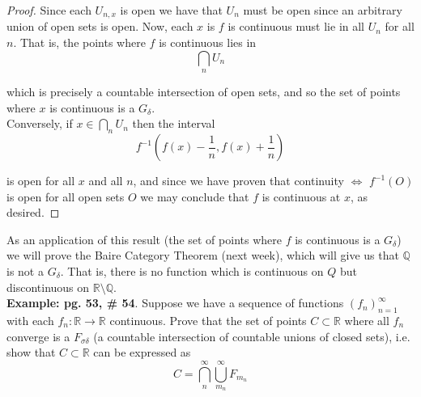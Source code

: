 \documentclass[12pt]{article}
\newlength\tindent
\renewcommand{\indent}{\hspace*{\tindent}}
\newcommand{\R}{\mathbb R}
\newcommand{\Q}{\mathbb Q}
\begin{document}
\begin{proof}
\indent Since each $U_{n,x}$ is open we have that $U_n$ must be open since an arbitrary union of open sets is open. Now, each $x$ is $f$ is continuous must lie in all $U_n$ for all $n$. That is, the points where $f$ is continuous lies in
\begin{equation*}
	\bigcap_{n} U_n
\end{equation*}

which is precisely a countable intersection of open sets, and so the set of points where $x$ is continuous is a $G_\delta$. \\

Conversely, if $x \in \bigcap_n U_n$ then the interval
\begin{equation*}
	f^{-1} \left( f(x) - \frac{1}{n}, f(x) + \frac{1}{n} \right)
\end{equation*}

is open for all $x$ and all $n$, and since we have proven that continuity $\iff$ $f^{-1}(O)$ is open for all open sets $O$ we may conclude that $f$ is continuous at $x$, as desired.
\end{proof}

\indent As an application of this result (the set of points where $f$ is continuous is a $G_\delta$) we will prove the Baire Category Theorem (next week), which will give us that $\Q$ is not a $G_\delta$. That is, there is no function which is continuous on $Q$ but discontinuous on $\R\setminus\Q$. \\

{\bf Example: pg. 53, \# 54}. Suppose we have a sequence of functions $(f_n)^\infty_{n = 1}$ with each $f_n:\R\to\R$ continuous. Prove that the set of points $C \subset \R$ where all $f_n$ converge is a $F_{\sigma\delta}$ (a countable intersection of countable unions of closed sets), i.e. show that $C \subset \R$ can be expressed as
\begin{equation*}
	C = \bigcap^\infty_{n} \bigcup^\infty_{m_n} F_{m_n}
\end{equation*}
\end{document}
